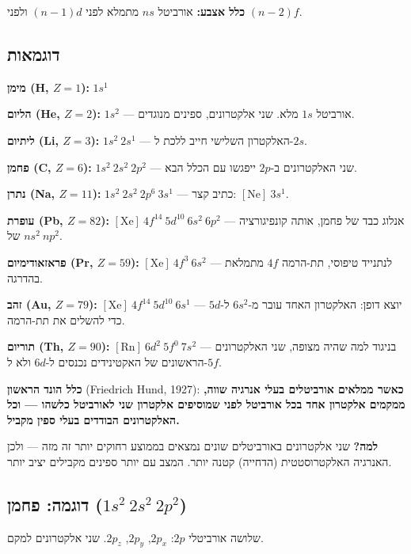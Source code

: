 \documentclass[
  hebrew,
  letterpaper,
  DIV=11,
  numbers=noendperiod]{scrreprt}
\begin{document}
\textbf{כלל אצבע:} אורביטל \(ns\) מתמלא לפני \((n-1)d\) ולפני
\((n-2)f\).

\subsection{דוגמאות}\label{ux5d3ux5d5ux5d2ux5deux5d0ux5d5ux5ea}

\textbf{מימן (H, \(Z=1\)):} \(1s^1\)

\textbf{הליום (He, \(Z=2\)):} \(1s^2\) --- אורביטל \(1s\) מלא. שני
אלקטרונים, ספינים מנוגדים.

\textbf{ליתיום (Li, \(Z=3\)):} \(1s^2\ 2s^1\) --- האלקטרון השלישי חייב
ללכת ל-\(2s\).

\textbf{פחמן (C, \(Z=6\)):} \(1s^2\ 2s^2\ 2p^2\) --- שני האלקטרונים
ב-\(2p\) ייפגשו עם הכלל הבא.

\textbf{נתרן (Na, \(Z=11\)):} \(1s^2\ 2s^2\ 2p^6\ 3s^1\) --- כתיב קצר:
\([\text{Ne}]\ 3s^1\).

\textbf{עופרת (Pb, \(Z=82\)):}
\([\text{Xe}]\ 4f^{14}\ 5d^{10}\ 6s^2\ 6p^2\) --- אנלוג כבד של פחמן,
אותה קונפיגורציה של \(ns^2\ np^2\).

\textbf{פראזאודימיום (Pr, \(Z=59\)):} \([\text{Xe}]\ 4f^3\ 6s^2\) ---
לנתנייד טיפוסי, תת-הרמה \(4f\) מתמלאת בהדרגה.

\textbf{זהב (Au, \(Z=79\)):} \([\text{Xe}]\ 4f^{14}\ 5d^{10}\ 6s^1\) ---
יוצא דופן: האלקטרון האחד עובר מ-\(6s^2\) ל-\(5d\) כדי להשלים את תת-הרמה.

\textbf{תוריום (Th, \(Z=90\)):} \([\text{Rn}]\ 6d^2\ 5f^0\ 7s^2\) ---
בניגוד למה שהיה מצופה, שני האלקטרונים הראשונים של האקטינידים נכנסים
ל-\(6d\) ולא ל-\(5f\).

\textbf{כלל הונד הראשון} (Friedrich Hund, 1927): \textbf{כאשר ממלאים
אורביטלים בעלי אנרגיה שווה, ממקמים אלקטרון אחד בכל אורביטל לפני שמוסיפים
אלקטרון שני לאורביטל כלשהו --- וכל האלקטרונים הבודדים בעלי ספין מקביל.}

\textbf{למה?} שני אלקטרונים באורביטלים שונים נמצאים בממוצע רחוקים יותר
זה מזה --- ולכן האנרגיה האלקטרוסטטית (הדחייה) קטנה יותר. המצב עם יותר
ספינים מקבילים יציב יותר.

\subsection{\texorpdfstring{דוגמה: פחמן
(\(1s^2\ 2s^2\ 2p^2\))}{דוגמה: פחמן (1s\^{}2\textbackslash{} 2s\^{}2\textbackslash{} 2p\^{}2)}}\label{ux5d3ux5d5ux5d2ux5deux5d4-ux5e4ux5d7ux5deux5df-1s2-2s2-2p2}

שלושה אורביטלי \(2p\): \(2p_x\), \(2p_y\), \(2p_z\). שני אלקטרונים למקם.
\end{document}

